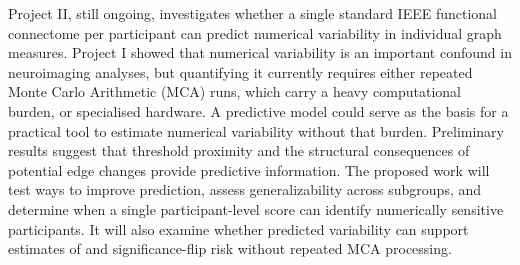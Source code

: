 \begin{onehalfspace}
Project II, still ongoing, investigates whether a single standard IEEE functional connectome per participant can predict numerical variability in individual graph measures. Project I showed that numerical variability is an important confound in neuroimaging analyses, but quantifying it currently requires either repeated Monte Carlo Arithmetic (MCA) runs, which carry a heavy computational burden, or specialised hardware. A predictive model could serve as the basis for a practical tool to estimate numerical variability without that burden. Preliminary results suggest that threshold proximity and the structural consequences of potential edge changes provide predictive information. The proposed work will test ways to improve prediction, assess generalizability across subgroups, and determine when a single participant-level score can identify numerically sensitive participants. It will also examine whether predicted variability can support estimates of \npvratio{} and significance-flip risk without repeated MCA processing.

\end{onehalfspace}
